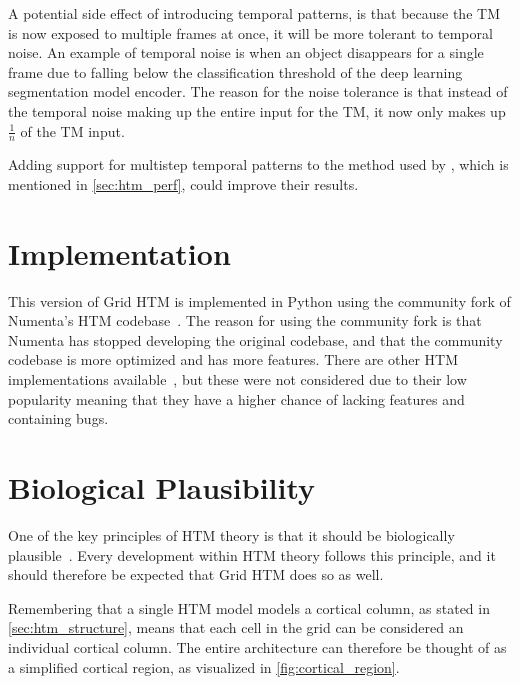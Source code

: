\par
A potential side effect of introducing temporal patterns, is that because the TM is now exposed to multiple frames at once, it will be more tolerant to temporal noise. An example of temporal noise is when an object disappears for a single frame due to falling below the classification threshold of the deep learning segmentation model encoder. The reason for the noise tolerance is that instead of the temporal noise making up the entire input for the TM, it now only makes up $\frac{1}{n}$ of the TM input.
\par
Adding support for multistep temporal patterns to the method used by \textcite{MotionAnomalyDetection}, which is mentioned in \autoref{sec:htm_perf}, could improve their results.
\section{Implementation}
This version of Grid HTM is implemented in Python using the community fork of Numenta's HTM codebase~\cite{htm_community_fork}. The reason for using the community fork is that Numenta has stopped developing the original codebase, and that the community codebase is more optimized and has more features. There are other HTM implementations available~\cite{htm_community_cuda,htm_community_brainblocks}, but these were not considered due to their low popularity meaning that they have a higher chance of lacking features and containing bugs.
\section{Biological Plausibility}
One of the key principles of HTM theory is that it should be biologically plausible~\cite{BAMI}. Every development within HTM theory follows this principle, and it should therefore be expected that Grid HTM does so as well.
\par
Remembering that a single HTM model models a cortical column, as stated in \autoref{sec:htm_structure}, means that each cell in the grid can be considered an individual cortical column. The entire architecture can therefore be thought of as a simplified cortical region, as visualized in \autoref{fig:cortical_region}.
